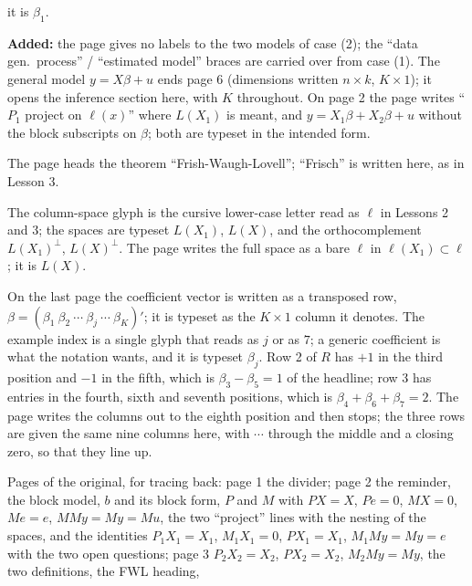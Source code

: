 \documentclass[11pt]{article}
\begin{document}
\begin{transcriptnotes}
        it is $\beta_{1}$.
  \item \textbf{Added:} the page gives no labels to the two models of case (2); the
        ``data gen.\ process'' / ``estimated model'' braces are carried over from
        case (1). The general model $y = X\beta + u$ ends page 6 (dimensions written
        $n\times k$, $K\times1$); it opens the inference section here, with $K$
        throughout. On page 2 the page writes ``$P_{1}$ project on $\ell(x)$''
        where $L(X_{1})$ is meant, and $y = X_{1}\beta + X_{2}\beta + u$ without the
        block subscripts on $\beta$; both are typeset in the intended form.
  \item The page heads the theorem ``Frish-Waugh-Lovell''; ``Frisch'' is written
        here, as in Lesson 3.
  \item The column-space glyph is the cursive lower-case letter read as $\ell$ in
        Lessons 2 and 3; the spaces are typeset $L(X_{1})$, $L(X)$, and the
        orthocomplement $L(X_{1})^{\perp}$, $L(X)^{\perp}$. The page writes the
        full space as a bare $\ell$ in $\ell(X_{1})\subset\ell$; it is $L(X)$.
  \item On the last page the coefficient vector is written as a transposed row,
        $\beta = (\beta_{1}\ \beta_{2}\ \cdots\ \beta_{j}\ \cdots\ \beta_{K})'$; it
        is typeset as the $K\times1$ column it denotes. The example index is a single
        glyph that reads as $j$ or as $7$; a generic coefficient is what the notation
        wants, and it is typeset $\beta_{j}$. Row 2 of $R$ has $+1$ in the third
        position and $-1$ in the fifth, which is $\beta_{3} - \beta_{5} = 1$ of the
        headline; row 3 has entries in the fourth, sixth and seventh positions, which
        is $\beta_{4} + \beta_{6} + \beta_{7} = 2$. The page writes the columns out to
        the eighth position and then stops; the three rows are given the same nine
        columns here, with $\cdots$ through the middle and a closing zero, so that
        they line up.
  \item Pages of the original, for tracing back: page 1 the divider; page 2 the
        reminder, the block model, $b$ and its block form, $P$ and $M$ with
        $PX = X$, $Pe = 0$, $MX = 0$, $Me = e$, $MMy = My = Mu$, the two
        ``project'' lines with the nesting of the spaces, and the identities
        $P_{1}X_{1} = X_{1}$, $M_{1}X_{1} = 0$, $PX_{1} = X_{1}$, $M_{1}My = My = e$
        with the two open questions; page 3 $P_{2}X_{2} = X_{2}$, $PX_{2} = X_{2}$,
        $M_{2}My = My$, the two definitions, the FWL heading,

\end{transcriptnotes}
\end{document}
